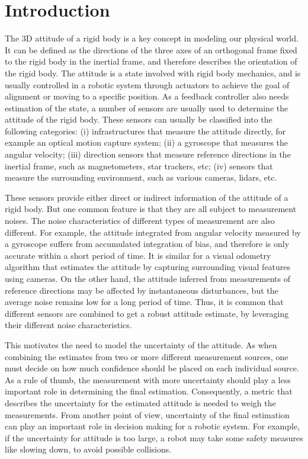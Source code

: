 
\chapter{Introduction} \label{chap:introduction}

The 3D attitude of a rigid body is a key concept in modeling our physical world.
It can be defined as the directions of the three axes of an orthogonal frame fixed to the rigid body in the inertial frame, and therefore describes the orientation of the rigid body.
The attitude is a state involved with rigid body mechanics, and is usually controlled in a robotic system through actuators to achieve the goal of alignment or moving to a specific position.
As a feedback controller also needs estimation of the state, a number of sensors are usually used to determine the attitude of the rigid body.
These sensors can usually be classified into the following categories:
(i) infrastructures that measure the attitude directly, for example an optical motion capture system;
(ii) a gyroscope that measures the angular velocity;
(iii) direction sensors that measure reference directions in the inertial frame, such as magnetometers, star trackers, etc;
(iv) sensors that measure the surrounding environment, such as various cameras, lidars, etc.

These sensors provide either direct or indirect information of the attitude of a rigid body.
But one common feature is that they are all subject to measurement noises.
The noise characteristics of different types of measurement are also different.
For example, the attitude integrated from angular velocity measured by a gyroscope suffers from accumulated integration of bias, and therefore is only accurate within a short period of time.
It is similar for a visual odometry algorithm that estimates the attitude by capturing surrounding visual features using cameras.
On the other hand, the attitude inferred from measurements of reference directions may be affected by instantaneous disturbances, but the average noise remains low for a long period of time.
Thus, it is common that different sensors are combined to get a robust attitude estimate, by leveraging their different noise characteristics.

This motivates the need to model the uncertainty of the attitude.
As when combining the estimates from two or more different measurement sources, one must decide on how much confidence should be placed on each individual source.
As a rule of thumb, the measurement with more uncertainty should play a less important role in determining the final estimation.
Consequently, a metric that describes the uncertainty for the estimated attitude is needed to weigh the measurements.
From another point of view, uncertainty of the final estimation can play an important role in decision making for a robotic system.
For example, if the uncertainty for attitude is too large, a robot may take some safety measures like slowing down, to avoid possible collisions.

